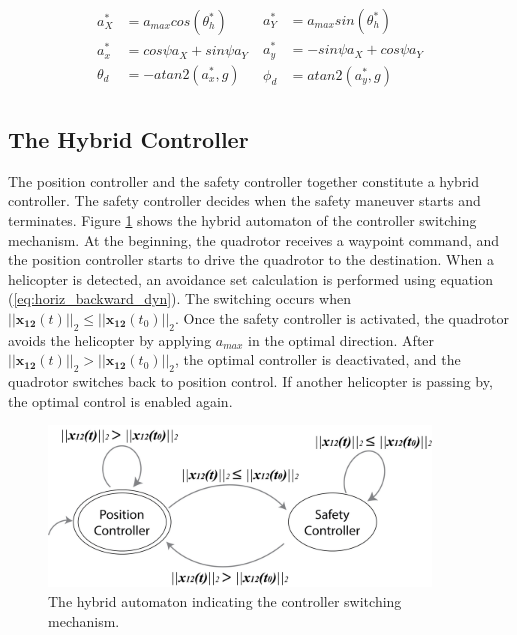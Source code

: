 \documentclass[journal,11pt,onecolumn,draftclsnofoot,]{IEEEtran}
\begin{document}
\begin{equation}
\label{eq:horiz_u_conversion}
\begin{aligned}
a_X^* &= a_{max}cos(\theta_h^*) \\
a_x^* &= cos\psi a_X + sin\psi a_Y \;\\
\theta_d &= -atan2(a_x^*,g) \\
\end{aligned}
\begin{aligned}
a_Y^* &= a_{max}sin(\theta_h^*) \\
a_y^* &= -sin\psi a_X + cos\psi a_Y \\
\phi_d &= atan2(a_y^*,g) \\
\end{aligned}
\end{equation}

\subsection{\textbf{The Hybrid Controller}}

The position controller and the safety controller together constitute a hybrid controller. The safety controller decides when the safety maneuver starts and terminates. Figure \ref{fig:hybrid_automaton} shows the hybrid automaton of the controller switching mechanism. At the beginning, the quadrotor receives a waypoint command, and the position controller starts to drive the quadrotor to the destination. When a helicopter is detected, an avoidance set calculation is performed using equation (\ref{eq:horiz_backward_dyn}). The switching occurs when $||\boldsymbol{x_{12}}(t)||_2 \le ||\boldsymbol{x_{12}}(t_0)||_2$. Once the safety controller is activated, the quadrotor avoids the helicopter by applying $a_{max}$ in the optimal direction. After $||\boldsymbol{x_{12}}(t)||_2 > ||\boldsymbol{x_{12}}(t_0)||_2$, the optimal controller is deactivated, and the quadrotor switches back to position control. If another helicopter is passing by, the optimal control is enabled again.

\begin{figure}
\centering
\includegraphics[width=4in]{hybrid_automaton}
\caption{The hybrid automaton indicating the controller switching mechanism.}
\label{fig:hybrid_automaton}
\end{figure}
\end{document}
